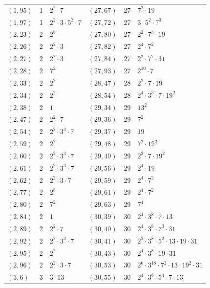 \documentclass[11pt]{article}
\begin{document}
\begin{longtable}{@{}lrl@{\qquad}lrl@{}}
$(1,95)$ & 1 & $2^{2}\cdot 7$ & $(27,67)$ & 27 & $7^{2}\cdot 19$\\
$(1,97)$ & 1 & $2^{2}\cdot 3\cdot 5^{2}\cdot 7$ & $(27,72)$ & 27 & $3\cdot 5^{2}\cdot 7^{3}$\\
$(2,23)$ & 2 & $2^{8}$ & $(27,80)$ & 27 & $2^{2}\cdot 7^{3}\cdot 19$\\
$(2,26)$ & 2 & $2^{2}\cdot 3$ & $(27,82)$ & 27 & $2^{4}\cdot 7^{2}$\\
$(2,27)$ & 2 & $2^{2}\cdot 3$ & $(27,84)$ & 27 & $2^{2}\cdot 7^{2}\cdot 31$\\
$(2,28)$ & 2 & $7^{2}$ & $(27,93)$ & 27 & $2^{10}\cdot 7$\\
$(2,33)$ & 2 & $2^{2}$ & $(28,47)$ & 28 & $2^{2}\cdot 7\cdot 19$\\
$(2,34)$ & 2 & $2^{2}$ & $(28,54)$ & 28 & $2^{4}\cdot 3^{3}\cdot 7\cdot 19^{2}$\\
$(2,38)$ & 2 & $1$ & $(29,34)$ & 29 & $13^{2}$\\
$(2,47)$ & 2 & $2^{2}\cdot 7$ & $(29,36)$ & 29 & $7^{2}$\\
$(2,54)$ & 2 & $2^{2}\cdot 3^{3}\cdot 7$ & $(29,37)$ & 29 & $19$\\
$(2,59)$ & 2 & $2^{2}$ & $(29,48)$ & 29 & $7^{2}\cdot 19^{2}$\\
$(2,60)$ & 2 & $2^{2}\cdot 3^{3}\cdot 7$ & $(29,49)$ & 29 & $2^{2}\cdot 7\cdot 19^{2}$\\
$(2,61)$ & 2 & $2^{2}\cdot 3^{3}\cdot 7$ & $(29,56)$ & 29 & $2^{4}\cdot 19$\\
$(2,62)$ & 2 & $2^{2}\cdot 3\cdot 7$ & $(29,59)$ & 29 & $2^{4}\cdot 7^{2}$\\
$(2,77)$ & 2 & $2^{8}$ & $(29,61)$ & 29 & $2^{4}\cdot 7^{2}$\\
$(2,80)$ & 2 & $7^{2}$ & $(29,63)$ & 29 & $7^{4}$\\
$(2,84)$ & 2 & $1$ & $(30,39)$ & 30 & $2^{4}\cdot 3^{8}\cdot 7\cdot 13$\\
$(2,89)$ & 2 & $2^{2}\cdot 7$ & $(30,40)$ & 30 & $2^{4}\cdot 3^{8}\cdot 7^{3}\cdot 31$\\
$(2,92)$ & 2 & $2^{2}\cdot 3^{3}\cdot 7$ & $(30,41)$ & 30 & $2^{2}\cdot 3^{8}\cdot 5^{2}\cdot 13\cdot 19\cdot 31$\\
$(2,95)$ & 2 & $2^{2}$ & $(30,43)$ & 30 & $2^{4}\cdot 3^{8}\cdot 19\cdot 31$\\
$(2,96)$ & 2 & $2^{2}\cdot 3\cdot 7$ & $(30,53)$ & 30 & $2^{6}\cdot 3^{18}\cdot 7^{2}\cdot 13\cdot 19^{2}\cdot 31$\\
$(3,6)$ & 3 & $3\cdot 13$ & $(30,55)$ & 30 & $2^{4}\cdot 3^{8}\cdot 5^{4}\cdot 7\cdot 13$\\

\end{longtable}
\end{document}
